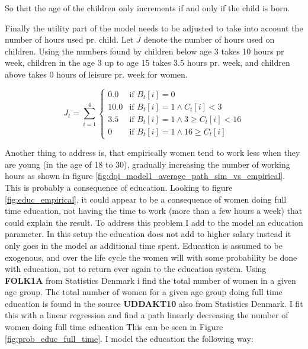 So that the age of the children only increments if and only if the child is born.

Finally the utility part of the model needs to be adjusted to take into account the number of hours used pr. child. Let $J$ denote the number of hours used on children. Using the numbers found by \parencite{ekert-jaffe_time_2015} children below age 3 takes 10 hours pr week, children in the age 3 up to age 15 takes 3.5 hours pr. week, and children above takes 0 hours of leisure pr. week for women. 

\begin{equation}
    J_t = \sum_{i=1}^4 \begin{cases}
        0.0 & \text{if } B_t[i] = 0 \\
        10.0 & \text{if } B_t[i] = 1 \land C_t[i] < 3 \\
        3.5 & \text{if } B_t[i] = 1 \land 3 \geq C_t[i] < 16 \\
        0 & \text{if } B_t[i] = 1 \land  16 \geq  C_t[i] 
    \end{cases}
\end{equation}

Another thing to address is, that empirically women tend to work less when they are young (in the age of 18 to 30), gradually increasing the number of working hours as shown in figure \ref{fig:dqi_model1_average_path_sim_vs_empirical}. This is probably a consequence of education. Looking to figure \ref{fig:educ_empirical}, it could appear to be a consequence of women doing full time education, not having the time to work (more than a few hours a week) that could explain the result. To address this problem I add to the model an education parameter. In this setup the education does not add to higher salary instead it only goes in the model as additional time spent. Education is assumed to be exogenous, and over the life cycle the women will with some probability be done with education, not to return ever again to the education system. Using \textbf{FOLK1A} from Statistics Denmark i find the total number of women in a given age group. The total number of women for a given age group doing full time education is found in the source \textbf{UDDAKT10} also from Statistics Denmark. I fit this with a linear regression and find a path linearly decreasing the number of women doing full time education This can be seen in Figure \ref{fig:prob_educ_full_time}. I model the education the following way:

